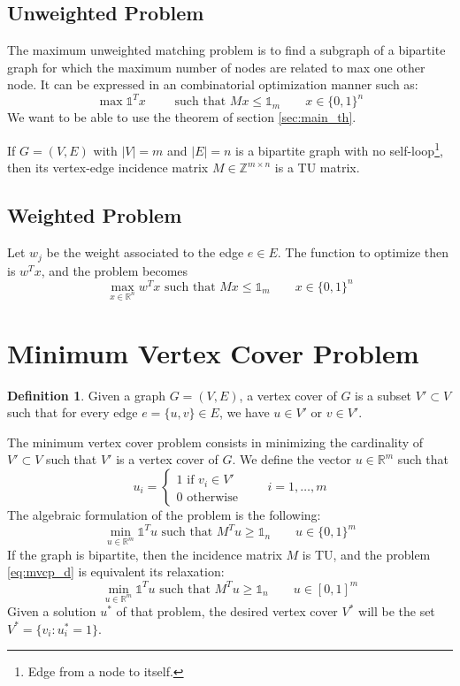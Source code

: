 \documentclass[12pt, openany]{report}
\newcommand{\R}{\mathbb{R}}
\theoremstyle{definition}
\newtheorem{definition}[thm]{Definition}
\begin{document}
\subsection{Unweighted Problem}
The maximum unweighted matching problem is to find a subgraph of a bipartite graph for which the maximum number of nodes are related to max one other node. It can be expressed in an combinatorial optimization manner such as:
\begin{equation}
    \max \mathbb{1}^Tx \qquad \text{ such that } Mx\le \mathbb{1}_m \qquad x\in \{0,1\}^n
\end{equation}
We want to be able to use the theorem of section \ref{sec:main_th}. 
\begin{tcolorbox}[breakable,
    colback=white,
    colframe=white!75!black,
    title={Theorem}]
If \(G=(V,E)\) with \(|V| = m\) and \(|E|=n\) is a bipartite graph with no self-loop\footnote{Edge from a node to itself.}, then its vertex-edge incidence matrix \(M\in \mathbb{Z}^{m\times n}\) is a TU matrix.
\end{tcolorbox}
\subsection{Weighted Problem}
Let \(w_j\) be the weight associated to the edge \(e\in E\). The function to optimize then is \(w^Tx\), and the problem becomes 
\begin{equation}
    \max_{x\in \R^n} w^Tx \text{   such that   }Mx\le \mathbb{1}_m \qquad x\in \{0,1\}^n
\end{equation}
\section{Minimum Vertex Cover Problem}
\begin{definition}
    Given a graph \(G=(V,E)\), a vertex cover of \(G\) is a subset \(V'\subset V\) such that for every edge \(e=\{u,v\}\in E\), we have \(u\in V'\) or \(v\in V'\).
\end{definition}
The minimum vertex cover problem consists in minimizing the cardinality of \(V'\subset V\) such that \(V'\) is a vertex cover of \(G\). We define the vector \(u\in \R^m\) such that
\begin{equation}
    u_i = \begin{cases}
        1 \text{ if } v_i\in V'\\
        0\text{ otherwise}
    \end{cases}\qquad i=1,\dots,m
\end{equation}
The algebraic formulation of the problem is the following:
\begin{equation}\label{eq:mvcp_d}
    \min_{u\in \R^m}\mathbb{1}^Tu \text{ such that }M^Tu\ge \mathbb{1}_n\qquad u\in \{0,1\}^m
\end{equation}
If the graph is bipartite, then the incidence matrix \(M\) is TU, and the problem \eqref{eq:mvcp_d} is equivalent its relaxation:
\begin{equation}
    \min_{u\in \R^m}\mathbb{1}^Tu \text{ such that }M^Tu\ge \mathbb{1}_n\qquad u\in [0,1]^m
\end{equation}
Given a solution \(u^*\) of that problem, the desired vertex cover \(V^*\) will be the set \(V^* = \{v_i:u_i^*=1\}\). 
\end{document}

